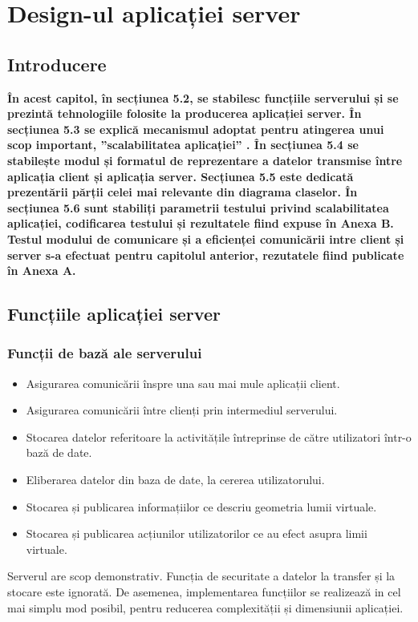 \chapter{Design-ul aplicației server}
\section{Introducere}
\par \textbf{În acest capitol, în secțiunea 5.2, se stabilesc funcțiile serverului și se prezintă tehnologiile folosite la producerea aplicației server. În secțiunea 5.3 se explică mecanismul adoptat pentru atingerea unui scop important, ”scalabilitatea aplicației” . În secțiunea 5.4 se stabilește modul și formatul de reprezentare a datelor transmise între aplicația client și aplicația server. Secțiunea 5.5 este dedicată prezentării părții celei mai relevante din diagrama claselor. În secțiunea 5.6 sunt stabiliți parametrii testului privind scalabilitatea aplicației, codificarea testului și rezultatele fiind expuse în Anexa B. Testul modului de comunicare și a eficienței comunicării intre client și server s-a efectuat pentru capitolul anterior, rezutatele fiind publicate în Anexa A. } 

\section{Funcțiile aplicației server}
\subsection{Funcții de bază ale serverului} 
\begin{itemize}
\item Asigurarea comunicării înspre una sau mai mule aplicații client.
\item Asigurarea comunicării între clienți prin intermediul serverului.
\item Stocarea datelor referitoare la activitățile întreprinse de către utilizatori într-o bază de date.
\item Eliberarea datelor din baza de date, la cererea utilizatorului.
\item Stocarea și publicarea informațiilor ce descriu geometria lumii virtuale.
\item Stocarea și publicarea acțiunilor utilizatorilor ce au efect asupra limii virtuale.
\end{itemize}

\par Serverul are scop demonstrativ. Funcția de securitate a datelor la transfer și la stocare este ignorată. De asemenea, implementarea funcțiilor se realizează in cel mai simplu mod posibil, pentru reducerea complexității și dimensiunii aplicației.

